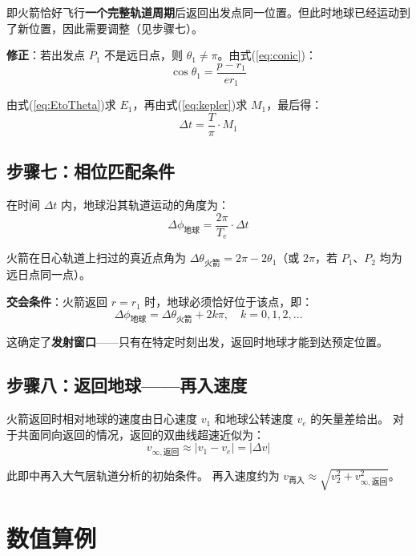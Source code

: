 \documentclass[12pt,a4paper]{ctexart}
\begin{document}
即火箭恰好飞行\textbf{一个完整轨道周期}后返回出发点同一位置。但此时地球已经运动到了新位置，因此需要调整（见步骤七）。

\textbf{修正}：若出发点 $P_1$ 不是远日点，则 $\theta_1 \neq \pi$。由式(\ref{eq:conic})：
\begin{equation}
    \cos\theta_1 = \frac{p - r_1}{e r_1}
\end{equation}

由式(\ref{eq:EtoTheta})求 $E_1$，再由式(\ref{eq:kepler})求 $M_1$，最后得：
\begin{equation}
    \Delta t = \frac{T}{\pi} \cdot M_1
\end{equation}

\subsection{步骤七：相位匹配条件}

在时间 $\Delta t$ 内，地球沿其轨道运动的角度为：
\begin{equation}
    \Delta\phi_{\text{地球}} = \frac{2\pi}{T_e} \cdot \Delta t
\end{equation}

火箭在日心轨道上扫过的真近点角为 $\Delta\theta_{\text{火箭}} = 2\pi - 2\theta_1$（或 $2\pi$，若 $P_1$、$P_2$ 均为远日点同一点）。

\textbf{交会条件}：火箭返回 $r = r_1$ 时，地球必须恰好位于该点，即：
\begin{equation}\label{eq:phasing}
    \Delta\phi_{\text{地球}} = \Delta\theta_{\text{火箭}} + 2k\pi, \quad k = 0,1,2,\ldots
\end{equation}

这确定了\textbf{发射窗口}——只有在特定时刻出发，返回时地球才能到达预定位置。

\subsection{步骤八：返回地球——再入速度}

火箭返回时相对地球的速度由日心速度 $v_1$ 和地球公转速度 $v_e$ 的矢量差给出。
对于共面同向返回的情况，返回的双曲线超速近似为：
\begin{equation}
    v_{\infty,\text{返回}} \approx |v_1 - v_e| = |\Delta v|
\end{equation}

此即\cite[\S10.2, pp.~849]{qian2008}中再入大气层轨道分析的初始条件。
再入速度约为 $v_{\text{再入}} \approx \sqrt{v_2^2 + v_{\infty,\text{返回}}^2}$。

\section{数值算例}
\end{document}
